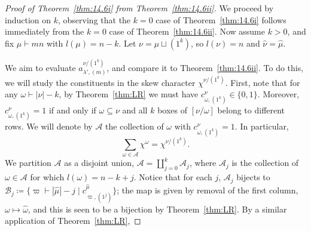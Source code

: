 \documentclass[ALCO, Unicode]{cedram}
\begin{document}
\begin{proof}[Proof of Theorem~\ref{thm:14.6i} from Theorem~\ref{thm:14.6ii}]
	We proceed by induction on $k$, observing that the $k=0$ case of Theorem~\ref{thm:14.6i} follows immediately from the $k=0$ case of Theorem~\ref{thm:14.6ii}. 
	Now assume $k>0$, and fix $\mu\vdash mn$ with $l(\mu)=n-k$. Let $\nu=\mu\sqcup(1^k)$, so $l(\nu)=n$ and $\hat{\nu}=\hat{\mu}$.
	
	We aim to evaluate $a^{\nu/(1^k)}_{\lambda',(m)}$, and compare it to Theorem~\ref{thm:14.6ii}. To do this, we will study the constituents in the skew character $\chi^{\nu/(1^k)}$. First, note that for any $\omega\vdash|\nu|-k$, by Theorem~\ref{thm:LR} we must have $c^\nu_{\omega,(1^k)}\in\{0,1\}$. Moreover, $c^\nu_{\omega,(1^k)}=1$ if and only if $\omega\subseteq\nu$ and all $k$ boxes of $[\nu/\omega]$ belong to different rows. We will denote by $\mathcal{A}$ the collection of $\omega$ with $c^\nu_{\omega,(1^k)}=1$. In particular,
	\[ \sum_{\omega\in\mathcal{A}}\chi^\omega = \chi^{{\nu}/(1^k)}. \]
	We partition $\mathcal{A}$ as a disjoint union, $\mathcal{A} = \coprod_{j=0}^{k}\mathcal{A}_j$, where $\mathcal{A}_j$ is the collection of $\omega\in\mathcal{A}$ for which $l(\omega)=n-k+j$. Notice that for each $j$, $\mathcal{A}_j$ bijects to $\mathcal{B}_j \coloneqq  \{\varpi\vdash|\hat{\mu}|-j \mid c^{\hat{\mu}}_{\varpi,(1^j)}\}$; the map is given by removal of the first column, $\omega\mapsto\hat{\omega}$, and this is seen to be a bijection by Theorem~\ref{thm:LR}. By a similar application of Theorem~\ref{thm:LR},
	

\end{proof}
\end{document}
